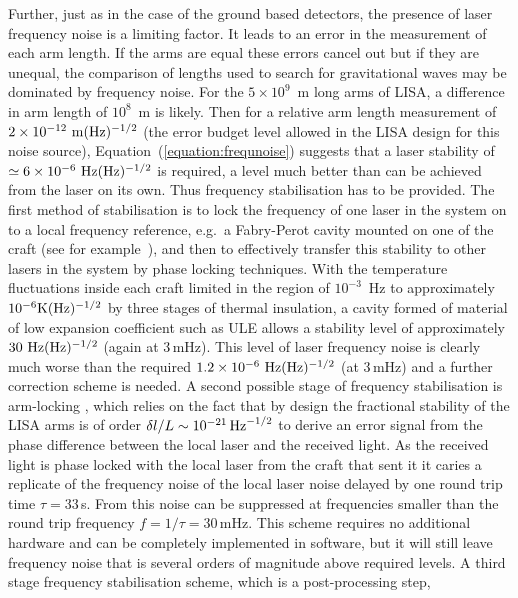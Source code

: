 \documentclass{article}
\begin{document}
Further, just as in the case of the ground based detectors, the presence of
laser frequency noise is a limiting factor. It leads to an error in the
measurement of each arm length. If the arms are equal these errors cancel out
but if they are unequal, the comparison of lengths used to search for
gravitational waves may be dominated by frequency noise. For the 
$5\times10^9$~m long arms of LISA, a difference in arm length of $10^8$~m is likely. Then for
a relative arm length measurement of $2 \times 10^{-12} {\rm \ m}(\rm
Hz)^{-1/2}$ (the error budget level allowed in the LISA design for this noise
source), Equation~(\ref{equation:frequnoise}) suggests that a laser stability of
$\simeq 6 \times 10^{-6} {\rm \ Hz}(\rm Hz)^{-1/2}$ is required, a level much
better than can be achieved from the laser on its own. Thus frequency
stabilisation has to be provided. The first method of stabilisation is to lock
the frequency of one laser in the system on to a local frequency reference, e.g.\ a Fabry-Perot cavity mounted on
one of the craft (see for example~\cite{McNamara}), and then to effectively
transfer this stability to other lasers in the system by phase locking
techniques. With the temperature fluctuations inside each craft limited in the
region of $10^{-3}$~Hz to approximately $10^{-6} {\rm K}(\rm Hz)^{-1/2}$ by
three stages of thermal insulation, a cavity formed of material of low expansion
coefficient such as ULE allows a stability level of approximately $30 {\rm \
Hz}(\rm Hz)^{-1/2}$ (again at 3\,mHz). This level of laser frequency noise is clearly much worse
than the required $1.2 \times 10^{-6}  {\rm \ Hz}(\rm Hz)^{-1/2}$ (at 3\,mHz) 
and a further correction scheme is needed. A second possible stage of frequency
stabilisation is arm-locking \cite{Sheard:2003}, which relies on the fact that 
by design the fractional stability of the LISA arms is of order $\delta{}l/L 
\sim 10^{-21}\,{\rm Hz}^{-1/2}$ to derive an error signal from the phase difference
between the local laser and the received light. As the received light is phase 
locked with the local laser from the craft that sent it it caries a replicate of
the frequency noise of the local laser noise delayed by one round trip time 
$\tau=33$\,s. From this noise can be suppressed at frequencies smaller than the 
round trip frequency $f= 1/\tau = 30$\,mHz. This scheme requires no additional 
hardware and can be completely implemented in software, but it will still leave 
frequency noise that is several orders of magnitude above required levels. 
A third stage frequency stabilisation scheme, which is a post-processing step, 
\end{document}
